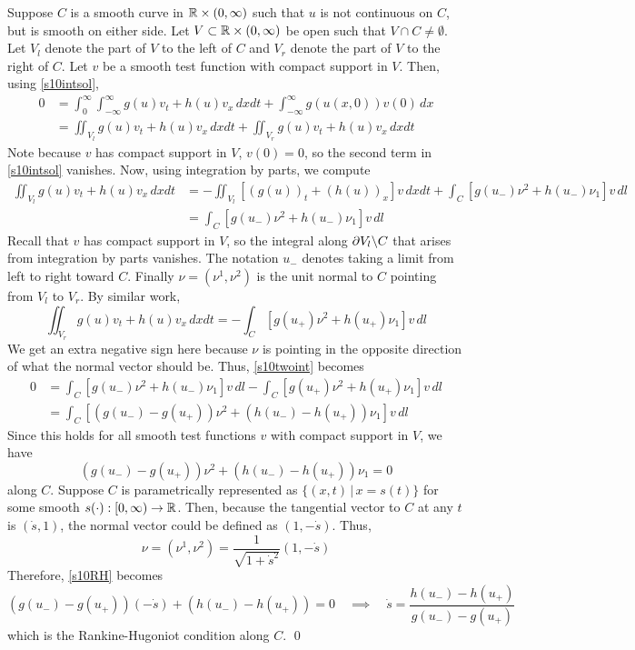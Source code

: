 Suppose $C$ is a smooth curve in $\mathbb{R} \times (0,\infty)$ such that $u$ is not continuous on $C$, but is smooth on either side. Let $V \subset \mathbb{R} \times (0,\infty)$ be open such that $V \cap C \neq \emptyset$. Let $V_l$ denote the part of $V$ to the left of $C$ and $V_r$ denote the part of $V$ to the right of $C$. Let $v$ be a smooth test function with compact support in $V$. Then, using \eqref{s10intsol},
\begin{align}
	\nonumber 0 &= \int_0^{\infty} \int_{-\infty}^{\infty} g(u)v_t + h(u)v_x \, dx dt + \int_{-\infty}^{\infty} g(u(x,0))v(0) \, dx \\
	\label{s10twoint} &= \iint_{V_l} g(u)v_t + h(u)v_x \, dx dt + \iint_{V_r} g(u)v_t + h(u)v_x \, dx dt
\end{align}
Note because $v$ has compact support in $V$, $v(0)=0$, so the second term in \eqref{s10intsol} vanishes. Now, using integration by parts, we compute
\begin{align*}
 \iint_{V_l} g(u) v_t + h(u) v_x \, dx dt &= -\iint_{V_l} [(g(u))_t + (h(u))_x] v \, dx dt + \int_C [g(u_-) \nu^2 + h(u_-) \nu_1] v \, dl \\
 &= \int_C [g(u_-) \nu^2 + h(u_-) \nu_1] v \, dl
\end{align*}
Recall that $v$ has compact support in $V$, so the integral along $\partial V_l \backslash C$ that arises from integration by parts vanishes. The notation $u_-$ denotes taking a limit from left to right toward $C$. Finally $\nu = (\nu^1,\nu^2)$ is the unit normal to $C$ pointing from $V_l$ to $V_r$. By similar work,
$$ \iint_{V_r} g(u) v_t + h(u) v_x \, dx dt = - \int_C [g(u_+) \nu^2 + h(u_+) \nu_1] v \, dl $$
We get an extra negative sign here because $\nu$ is pointing in the opposite direction of what the normal vector should be. Thus, \eqref{s10twoint} becomes
\begin{align*}
0 &= \int_C [g(u_-) \nu^2 + h(u_-) \nu_1] v \, dl - \int_C [g(u_+) \nu^2 + h(u_+) \nu_1] v \, dl \\
&= \int_C [(g(u_-) - g(u_+))\nu^2 + (h(u_-)-h(u_+)) \nu_1]v \, dl
\end{align*}
Since this holds for all smooth test functions $v$ with compact support in $V$, we have
\begin{equation}
\label{s10RH}
	(g(u_-) - g(u_+))\nu^2 + (h(u_-)-h(u_+)) \nu_1 = 0
\end{equation}
along $C$. Suppose $C$ is parametrically represented as $\{(x,t) \, | \, x = s(t) \}$ for some smooth $s(\cdot) : [0,\infty) \to \mathbb{R}$. Then, because the tangential vector to $C$ at any $t$ is $(\dot s,1)$, the normal vector could be defined as $(1,-\dot s)$. Thus,
$$ \nu = (\nu^1,\nu^2) = \frac{1}{\sqrt{1+\dot s^2}} ( 1, -\dot s) $$
Therefore, \eqref{s10RH} becomes
$$ (g(u_-) - g(u_+))(-\dot s) + (h(u_-)-h(u_+)) = 0 \quad \implies \quad \dot s = \frac{h(u_-)-h(u_+)}{g(u_-) - g(u_+)} $$
which is the Rankine-Hugoniot condition along $C$. \hfill\qed


